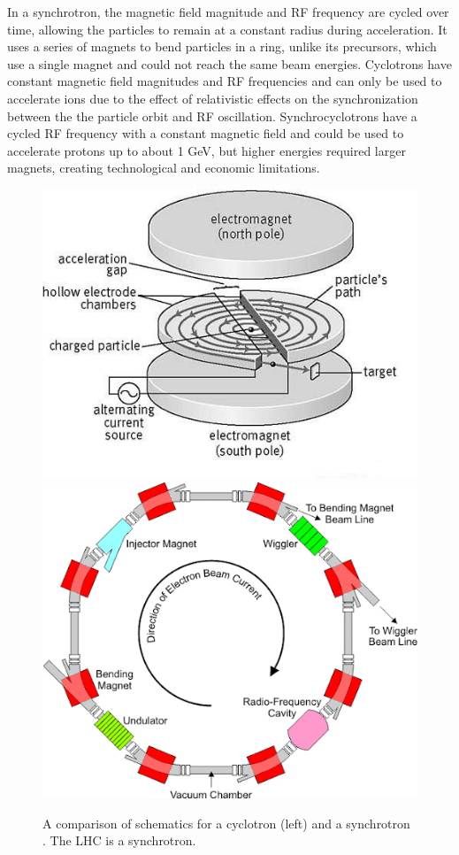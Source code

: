 In a synchrotron, the magnetic field magnitude and RF frequency are cycled over time, allowing the particles to remain at a constant radius during acceleration. It uses a series of magnets to bend particles in a ring, unlike its precursors, which use a single magnet and could not reach the same beam energies. Cyclotrons have constant magnetic field magnitudes and RF frequencies and can only be used to accelerate ions due to the effect of relativistic effects on the synchronization between the the particle orbit and RF oscillation. Synchrocyclotrons have a cycled RF frequency with a constant magnetic field and could be used to accelerate protons up to about 1 GeV, but higher energies required larger magnets, creating technological and economic limitations. \cite{synchrotrons} 

\begin{figure}[htbp]
\centering
\includegraphics[width=.3\textwidth]{figures/Detector/cyclo-schematic.png}
\includegraphics[width=.3\textwidth]{figures/Detector/synchro-schematic.png}
\caption{A comparison of schematics for a cyclotron (left) \cite{cyclo-pic} and a synchrotron \cite{synchro-pic}. The \ac{LHC} is a synchrotron.}
\end{figure}



